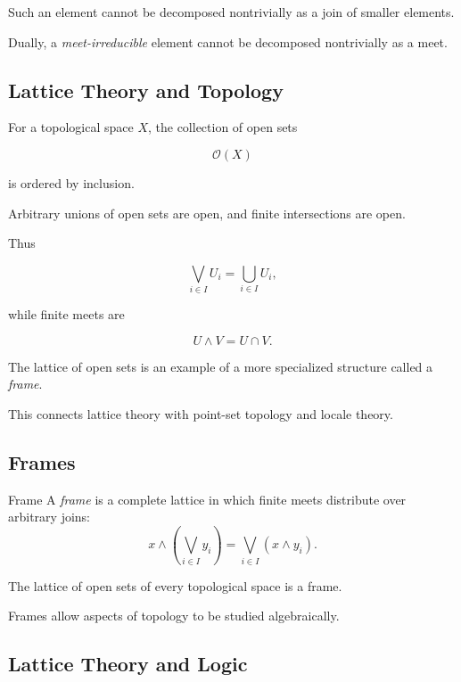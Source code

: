 Such an element cannot be decomposed nontrivially as a join of smaller
elements.

Dually, a \emph{meet-irreducible} element cannot be decomposed nontrivially
as a meet.

\subsection{Lattice Theory and Topology}
\label{subsec:lattice-topology}

For a topological space \(X\), the collection of open sets

\[ \mathcal O(X) \]

is ordered by inclusion.

Arbitrary unions of open sets are open, and finite intersections are open.

Thus

\[ \bigvee_{i\in I}U_i=\bigcup_{i\in I}U_i, \]

while finite meets are

\[ U\wedge V=U\cap V. \]

The lattice of open sets is an example of a more specialized structure
called a \emph{frame}.

This connects lattice theory with point-set topology and locale theory.

\subsection{Frames}
\label{subsec:lattice-frames}

\begin{definitionbox}{Frame}
A \emph{frame} is a complete lattice in which finite meets distribute over
arbitrary joins:
\[ x\wedge\left(\bigvee_{i\in I}y_i\right)
=\bigvee_{i\in I}(x\wedge y_i). \]
\end{definitionbox}

The lattice of open sets of every topological space is a frame.

Frames allow aspects of topology to be studied algebraically.

\subsection{Lattice Theory and Logic}
\label{subsec:lattice-logic}

